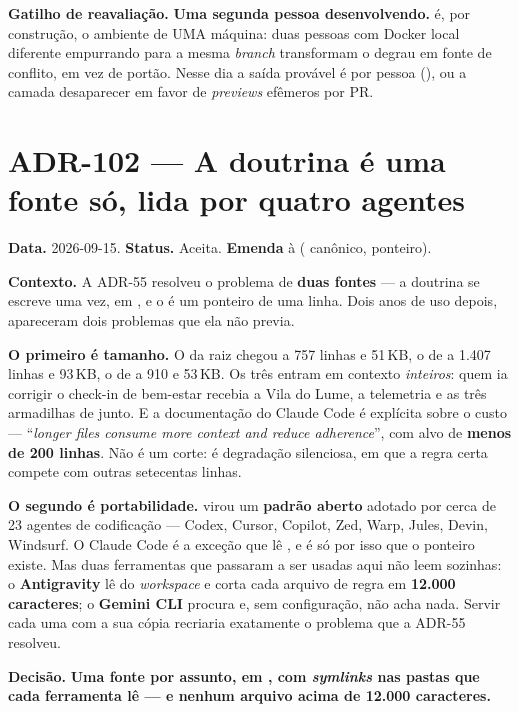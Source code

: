 \textbf{Gatilho de reavaliação.} \textbf{Uma segunda pessoa desenvolvendo.}
 é, por construção, o ambiente de UMA máquina: duas pessoas com
Docker local diferente empurrando para a mesma \emph{branch} transformam o
degrau em fonte de conflito, em vez de portão. Nesse dia a saída provável é
 por pessoa (), ou a camada desaparecer em
favor de \emph{previews} efêmeros por PR.


\section{ADR-102 --- A doutrina é uma fonte só, lida por quatro agentes}
\label{adr:agentes-portateis}

\textbf{Data.} 2026-09-15. \textbf{Status.} Aceita.
\textbf{Emenda} à  ( canônico, 
ponteiro).

\textbf{Contexto.} A ADR-55 resolveu o problema de \textbf{duas fontes} --- a
doutrina se escreve uma vez, em , e o  é um
ponteiro de uma linha. Dois anos de uso depois, apareceram dois problemas que
ela não previa.

\textbf{O primeiro é tamanho.} O  da raiz chegou a 757 linhas e
51\,KB, o de  a 1.407 linhas e 93\,KB, o de  a 910 e
53\,KB. Os três entram em contexto \emph{inteiros}: quem ia corrigir o
check-in de bem-estar recebia a Vila do Lume, a telemetria e as três armadilhas
de  junto. E a documentação do Claude Code é explícita sobre o custo
--- \enquote{\emph{longer files consume more context and reduce adherence}},
com alvo de \textbf{menos de 200 linhas}. Não é um corte: é degradação
silenciosa, em que a regra certa compete com outras setecentas linhas.

\textbf{O segundo é portabilidade.}  virou um \textbf{padrão
aberto} adotado por cerca de 23 agentes de codificação --- Codex, Cursor,
Copilot, Zed, Warp, Jules, Devin, Windsurf. O Claude Code é a exceção que lê
, e é só por isso que o ponteiro existe. Mas duas ferramentas
que passaram a ser usadas aqui não leem  sozinhas: o
\textbf{Antigravity} lê  do \emph{workspace} e corta cada
arquivo de regra em \textbf{12.000 caracteres}; o \textbf{Gemini CLI} procura
 e, sem configuração, não acha nada. Servir cada uma com a sua
cópia recriaria exatamente o problema que a ADR-55 resolveu.

\textbf{Decisão.} \textbf{Uma fonte por assunto, em , com
\emph{symlinks} nas pastas que cada ferramenta lê --- e nenhum arquivo acima de
12.000 caracteres.}

